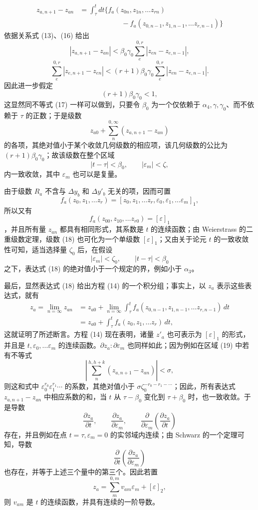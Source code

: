 \documentclass[11pt,a4paper,leqno]{article}
\begin{document}
\[
\begin{aligned}
z_{a,n+1}-z_{an}
&=\int_\tau^t dt\bigl\{f_a(z_{0n},z_{1n},\ldots z_{rn})\\
&\hspace{6em}-f_a(z_{0,n-1},z_{1,n-1},\ldots z_{r,n-1})\bigr\}
\end{aligned}
\]
依据关系式 (13)、(16) 给出
\[
|z_{a,n+1}-z_{an}|<\beta_0\gamma_0
\sum_e^{0,r}|z_{en}-z_{e,n-1}|,
\]
\[
\sum_e^{0,r}|z_{e,n+1}-z_{en}|<(r+1)\beta_0\gamma_0
\sum_e^{0,r}|z_{en}-z_{e,n-1}|.
\]
因此进一步假定
\[
(r+1)\beta_0\gamma_0<1,
\]
这显然同不等式 (17) 一样可以做到，只要令 $\beta_0$ 为一个仅依赖于 $\alpha_4,\gamma,\gamma_0$、而不依赖于 $\tau$ 的正数；于是级数
\begin{equation}\tag{18}
z_{a0}+\sum_n^{0,\infty}(z_{a,n+1}-z_{an})
\end{equation}
的各项，其绝对值小于某个收敛几何级数的相应项，该几何级数的公比为 $(r+1)\beta_0\gamma_0$；故该级数在整个区域
\[
|t-\tau|<\beta_0,\qquad |\varepsilon_m|<\zeta,
\]
内一致收敛，其中 $\varepsilon_m$ 也可以是复量。

由于级数 $R_a$ 不含与 $\Delta y_b$ 和 $\Delta y'_b$ 无关的项，因而可置
\[
f_a(z_0,z_1,\ldots z_r)
=[z_0,z_1,\ldots z_r,\varepsilon_0,\varepsilon_1,\ldots\varepsilon_m]_1,
\]
所以又有
\[
f_a(z_{00},z_{10},\ldots z_{r0})=[\varepsilon]_1
\]
，并且所有量 $z_{an}$ 都具有相同形式，其系数是 $t$ 的连续函数；由 Weierstrass 的二重级数定理，级数 (18) 也可化为一个单级数 $[\varepsilon]_1$；又由关于论元 $t$ 的一致收敛性可知，适当选择量 $\zeta_0$ 后，在假设
\begin{equation}\tag{19}
|\varepsilon_m|<\zeta_0,\qquad |t-\tau|<\beta_0
\end{equation}
之下，表达式 (18) 的绝对值小于一个规定的界，例如小于 $\alpha_3$。

最后，显然表达式 (18) 给出方程 (14) 的一个积分组；事实上，以 $z_a$ 表示这些表达式，就有
\[
\begin{aligned}
z_a=\lim_{n=\infty}z_{an}
&=z_{a0}+\lim_{n=\infty}\int_\tau^t
f_a(z_{0,n-1},z_{1,n-1},\ldots z_{r,n-1})\,dt\\
&=z_{a0}+\int_\tau^t f_a(z_0,z_1,\ldots z_r)\,dt,
\end{aligned}
\]
这就证明了所述断言。方程 (14) 现在表明，诸量 $z'_a$ 也可表示为 $[\varepsilon]_1$ 的形式，并且是 $t,\varepsilon_0,\ldots \varepsilon_m$ 的连续函数。$\partial z_a:\partial\varepsilon_m$ 也同样如此；因为例如在区域 (19) 中若有不等式
\[
\left|\sum_n^{h,h+k}(z_{a,n+1}-z_{an})\right|<\sigma,
\]
则这和式中 $\varepsilon_0^{r_0}\varepsilon_1^{r_1}\cdots$ 的系数，其绝对值小于 $\sigma\zeta_0^{-r_0-r_1-\cdots}$；因此，所有表达式 $z_{a,n+1}-z_{an}$ 中相应系数的和，当 $t$ 从 $\tau-\beta_0$ 变化到 $\tau+\beta_0$ 时，也一致收敛。于是导数
\[
\frac{\partial z_a}{\partial t},\qquad
\frac{\partial z_a}{\partial\varepsilon_m},\qquad
\frac{\partial}{\partial\varepsilon_m}
\left(\frac{\partial z_a}{\partial t}\right)
\]
存在，并且例如在点 $t=\tau,\varepsilon_m=0$ 的实邻域内连续；由 Schwarz 的一个定理可知，导数
\[
\frac{\partial}{\partial t}
\left(\frac{\partial z_a}{\partial\varepsilon_m}\right)
\]
也存在，并等于上述三个量中的第三个。因此若置
\[
z_a=\sum_m^{0,m}v_{am}\varepsilon_m+[\varepsilon]_2,
\]
则 $v_{am}$ 是 $t$ 的连续函数，并具有连续的一阶导数。
\end{document}
